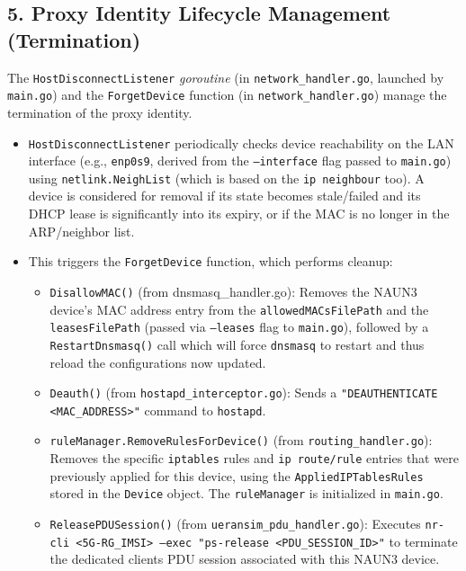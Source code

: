 \subsection{5. Proxy Identity Lifecycle Management (Termination)}

The \texttt{HostDisconnectListener} \textit{goroutine} (in \texttt{network\_handler.go}, launched by \texttt{main.go}) and the \texttt{ForgetDevice} function (in \texttt{network\_handler.go}) manage the termination of the proxy identity.

\begin{itemize}
    \item \texttt{HostDisconnectListener} periodically checks device reachability on the \ac{LAN} interface (e.g., \texttt{enp0s9}, derived from the \texttt{--interface} flag passed to \texttt{main.go}) using \texttt{netlink.NeighList} (which is based on the \texttt{ip neighbour} too). A device is considered for removal if its state becomes stale/failed and its \ac{DHCP} lease is significantly into its expiry, or if the \ac{MAC} is no longer in the \ac{ARP}/neighbor list.

    \item{
        This triggers the \texttt{ForgetDevice} function, which performs cleanup:
        \begin{itemize}
            \item \texttt{DisallowMAC()} (from dnsmasq\_handler.go): Removes the \ac{NAUN3} device's \ac{MAC} address entry from the \texttt{allowedMACsFilePath} and the \texttt{leasesFilePath} (passed via \texttt{--leases} flag to \texttt{main.go}), followed by a \texttt{RestartDnsmasq()} call which will force \texttt{dnsmasq} to restart and thus reload the configurations now updated.

            \item \texttt{Deauth()} (from \texttt{hostapd\_interceptor.go}): Sends a \texttt{"DEAUTHENTICATE <MAC\_ADDRESS>"} command to \texttt{hostapd}.

            \item \texttt{ruleManager.RemoveRulesForDevice()} (from \texttt{routing\_handler.go}): Removes the specific \texttt{iptables} rules and \texttt{ip route/rule} entries that were previously applied for this device, using the \texttt{AppliedIPTablesRules} stored in the \texttt{Device} object. The \texttt{ruleManager} is initialized in \texttt{main.go}.

            \item \texttt{ReleasePDUSession()} (from \texttt{ueransim\_pdu\_handler.go}): Executes \texttt{nr-cli <5G-RG\_IMSI> --exec "ps-release <PDU\_SESSION\_ID>"} to terminate the dedicated clients \ac{PDU} session associated with this \ac{NAUN3} device.


\end{itemize}}
\end{itemize}
